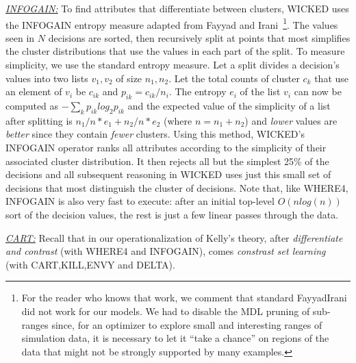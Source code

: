 \documentclass[runningheads]{llncs}
\begin{document}
\underline{{\em INFOGAIN:}} To find attributes that differentiate between clusters,
WICKED uses the INFOGAIN entropy measure adapted from
Fayyad and Irani~\cite{FayIra93Multi}\footnote{For the reader
who knows that work, we comment that standard
FayyadIrani did not work for our models. We had to disable
the MDL pruning of sub-ranges since, for an optimizer to explore  small
and interesting ranges of simulation data, it is necessary
to let it ``take a chance'' on regions of the data that might not
be strongly supported by many examples.}. The values seen in $N$
decisions are sorted, then recursively split at points that
most simplifies the cluster distributions that use the values
in each part of the split. To measure simplicity, we use the
standard entropy measure. Let a split divides a decision's
values into two
lists  $v_1,v_2$ of size $n_1,n_2$. Let  the total counts
of cluster $c_k$ that use an element of $v_i$ be $c_{ik}$
and 
$p_{ik} = c_{ik}/n_i$. The entropy $e_i$ of the list $v_i$ can now be computed
as 
$-\sum_{k}p_{ik}log_2{p_{ik}}$ and the expected value of the simplicity
of a list after splitting is 
\mbox{$n_1/n*e_1 + n_2/n*e_2$} (where $n=n_1 + n_2$)
and {\em lower} values are {\em better} since they contain {\em fewer}
clusters.
Using this method, WICKED's INFOGAIN operator ranks 
all attributes according to the  simplicity of their associated
cluster distribution. It then rejects all but the simplest
25\% of the decisions and all subsequent reasoning in WICKED
uses just this small set of decisions that most distinguish
the cluster of decisions. Note that, like WHERE4, INFOGAIN is
also very fast to execute: after an initial top-level 
$O(nlog(n))$
sort of the decision values, the rest is just a
few linear
passes through the data.



\underline{{\em CART:}} Recall that in our
operationalization of Kelly's theory,
after {\em differentiate and
contrast} (with
WHERE4 and INFOGAIN), comes {\em constrast set learning}
(with CART,KILL,ENVY and DELTA).
\end{document}
